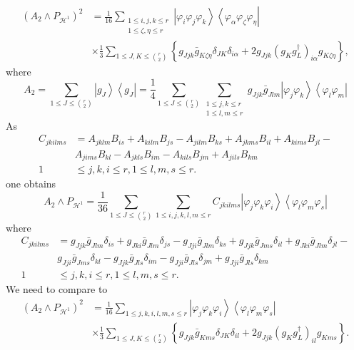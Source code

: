 \documentclass[aps,preprint]{revtex4}%
\begin{document}
\begin{align}
\left(  A_{2}\wedge P_{\mathcal{H}^{1}}\right)  ^{2}  &  =\frac{1}{16}%
\sum_{\substack{1\leq i,j,k\leq r\\1\leq\zeta,\eta\leq r}}\left\vert
\varphi_{i}\varphi_{j}\varphi_{k}\right\rangle \left\langle \varphi_{\alpha
}\varphi_{\zeta}\varphi_{\eta}\right\vert \\
&  \times\frac{1}{3}\sum_{1\leq J,K\leq\binom{r}{2}}\left\{  g_{Jjk}\bar
{g}_{K\zeta\eta}\delta_{JK}\delta_{i\alpha}+2g_{Jjk}\left(  g_{K}%
g_{L}^{\dagger}\right)  _{i\alpha}g_{K\zeta\eta}\right\}  ,
\end{align}
where%
\begin{equation}
A_{2}=\sum_{1\leq J\leq\binom{r}{2}}\left\vert g_{J}\right\rangle \left\langle
g_{J}\right\vert =\frac{1}{4}\sum_{1\leq J\leq\binom{r}{2}}\sum
_{\substack{1\leq j,k\leq r\\1\leq l,m\leq r}}g_{Jjk}\bar{g}_{Jlm}\left\vert
\varphi_{j}\varphi_{k}\right\rangle \left\langle \varphi_{l}\varphi
_{m}\right\vert
\end{equation}
As
\begin{align}
C_{jkilms}  &  =A_{jklm}B_{is}+A_{kilm}B_{js}-A_{jilm}B_{ks}+A_{jkms}%
B_{il}+A_{kims}B_{jl}-\nonumber\\
&  A_{jims}B_{kl}-A_{jkls}B_{im}-A_{kils}B_{jm}+A_{jils}B_{km}\nonumber\\
1  &  \leq j,k,i\leq r,1\leq l,m,s\leq r.
\end{align}
one obtains
\begin{equation}
A_{2}\wedge P_{\mathcal{H}^{1}}=\frac{1}{36}\sum_{1\leq J\leq\binom{r}{2}}%
\sum_{1\leq i,j,k,l,m\leq r}C_{jkilms}\left\vert \varphi_{j}\varphi_{k}%
\varphi_{i}\right\rangle \left\langle \varphi_{l}\varphi_{m}\varphi
_{s}\right\vert
\end{equation}
where
\begin{align}
C_{jkilms}  &  =g_{Jjk}\bar{g}_{Jlm}\delta_{is}+g_{Jki}\bar{g}_{Jlm}%
\delta_{js}-g_{Jji}\bar{g}_{Jlm}\delta_{ks}+g_{Jjk}\bar{g}_{Jms}\delta
_{il}+g_{Jki}\bar{g}_{Jlm}\delta_{jl}-\nonumber\\
&  g_{Jji}\bar{g}_{Jms}\delta_{kl}-g_{Jjk}\bar{g}_{Jls}\delta_{im}-g_{Jji}%
\bar{g}_{Jls}\delta_{jm}+g_{Jji}\bar{g}_{Jls}\delta_{km}\nonumber\\
1  &  \leq j,k,i\leq r,1\leq l,m,s\leq r.
\end{align}
We need to compare to
\begin{align}
\left(  A_{2}\wedge P_{\mathcal{H}^{1}}\right)  ^{2}  &  =\frac{1}{16}%
\sum_{1\leq j,k,i,l,m,s\leq r}\left\vert \varphi_{j}\varphi_{k}\varphi
_{i}\right\rangle \left\langle \varphi_{l}\varphi_{m}\varphi_{s}\right\vert
\nonumber\\
&  \times\frac{1}{3}\sum_{1\leq J,K\leq\binom{r}{2}}\left\{  g_{Jjk}\bar
{g}_{Kms}\delta_{JK}\delta_{il}+2g_{Jjk}\left(  g_{K}g_{L}^{\dagger}\right)
_{il}g_{Kms}\right\}  .
\end{align}%
\end{document}
